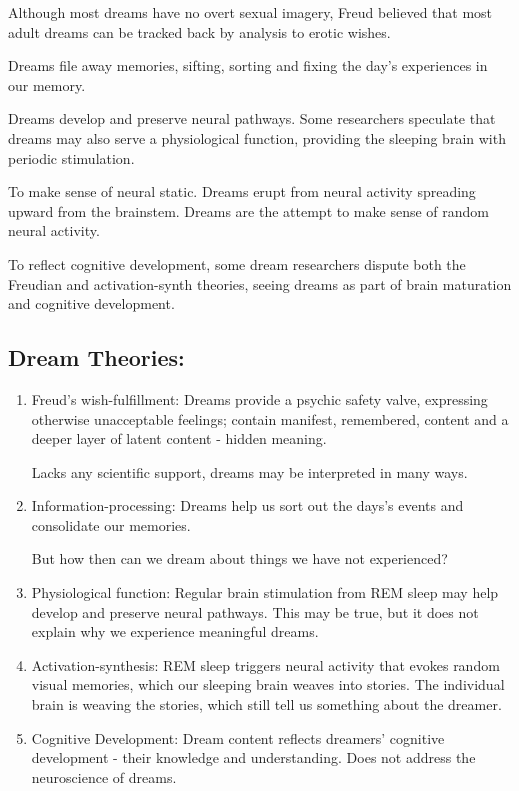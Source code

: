 \documentclass[12pt]{article}
\begin{document}
Although most dreams have no overt sexual imagery, Freud believed that most adult dreams can be tracked back by analysis to erotic wishes. 

Dreams file away memories, sifting, sorting and fixing the day's experiences in our memory. 

Dreams develop and preserve neural pathways. Some researchers speculate that dreams may also serve a physiological function, providing the sleeping brain with periodic stimulation. 

To make sense of neural static. Dreams erupt from neural activity spreading upward from the brainstem. Dreams are the attempt to make sense of random neural activity.

To reflect cognitive development, some dream researchers dispute both the Freudian and activation-synth theories, seeing dreams as part of brain maturation and cognitive development.

\subsection*{Dream Theories:}
\begin{enumerate}
\item Freud's wish-fulfillment: Dreams provide a psychic safety valve, expressing otherwise unacceptable feelings; contain manifest, remembered, content and a deeper layer of latent content - hidden meaning. 

Lacks any scientific support, dreams may be interpreted in many ways.

\item Information-processing: Dreams help us sort out the days's events and consolidate our memories. 

But how then can we dream about things we have not experienced?

\item Physiological function: Regular brain stimulation from REM sleep may help develop and preserve neural pathways. This may be true, but it does not explain why we experience meaningful dreams.

\item Activation-synthesis: REM sleep triggers neural activity that evokes random visual memories, which our sleeping brain weaves into stories. The individual brain is weaving the stories, which still tell us something about the dreamer.

\item Cognitive Development: Dream content reflects dreamers' cognitive development - their knowledge and understanding. Does not address the neuroscience of dreams.

\end{enumerate}
\end{document}
